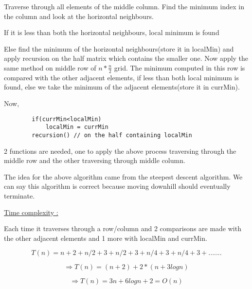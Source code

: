 \documentclass[12pt]{article}
\begin{document}
\begin{enumerate}
    Traverse through all elements of the middle column. Find the minimum index in the column and look at the horizontal neighbours.
    
    If it is less than both the horizontal neighbours, local minimum is found
    
    Else find the minimum of the horizontal neighbours(store it in localMin) and apply recursion on the half matrix which contains the smaller one. Now apply the same method on middle row of $n*\frac{n}{2}$ grid. The minimum computed in this row is compared with the other adjacent elements, if less than both local minimum is found, else we take the minimum of the adjacent elements(store it in currMin).
    
    Now, 
    
    \begin{verbatim}
        if(currMin<localMin) 
            localMin = currMin
        recursion() // on the half containing localMin
    \end{verbatim}  
                    
    
    2 functions are needed, one to apply the above process traversing through the middle row and the other traversing through middle column.
    
    The idea for the above algorithm came from the steepest descent algorithm. We can say this algorithm is correct because moving downhill should eventually terminate.
    
    \underline{Time complexity :}
    
    Each time it traverses through a row/column and 2 comparisons are made with the other adjacent elements and 1 more with localMin and currMin.
    
    \[ T(n) = n + 2 + n/2 + 3 + n/2 + 3 + n/4 + 3 + n/4 + 3 + ....... \]
    
    \[ \Rightarrow T(n) = (n+2) + 2*(n + 3logn) \]
    
    \[ \Rightarrow T(n) = 3n + 6logn + 2 = O(n) \]
    

\end{enumerate}
\end{document}
